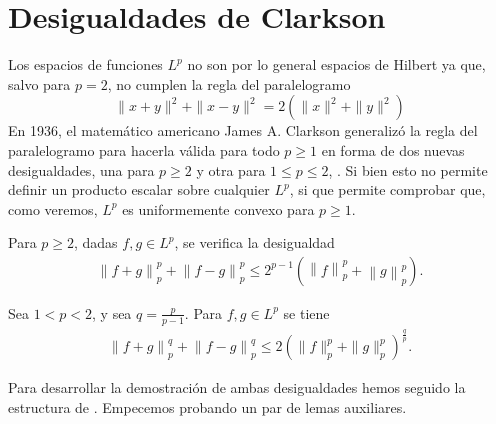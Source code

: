 

\section{Desigualdades de Clarkson}

Los espacios de funciones $ L^p $ no son por lo general espacios de Hilbert ya que, salvo para $ p = 2 $, no cumplen la regla del paralelogramo
$$
    \| x + y \|^2 + \| x - y \|^2 = 2 \left( \| x \|^2 + \| y\|^2 \right)
$$
En 1936, el matemático americano James A. Clarkson generalizó la regla del paralelogramo para hacerla válida para todo $ p \geq 1 $ en forma de dos nuevas desigualdades, una para $p \geq 2 $ y otra para $ 1 \leq p \leq 2 $, \cite{clarkson}. Si bien esto no permite definir un producto escalar sobre cualquier $ L^p $, si que permite comprobar que, como veremos, $ L^p $ es uniformemente convexo para $ p \geq 1 $.

\begin{theorem} \label{thm:clarkson-1}
    Para $ p \geq 2 $, dadas $ f, g \in L^p $, se verifica la desigualdad
    \begin{align} \label{eq:clarkson-1}
        \left\| f+g \right\|_p^p + \left\| f-g \right\|_p^p \leq 2^{p-1} \left( \left\|f\right\|_p^p + \left\|g\right\|_p^p \right).
    \end{align}
\end{theorem}

\begin{theorem}
    Sea $ 1 < p < 2 $, y sea $ q = \frac{p}{p-1}$. Para $ f, g \in L^p $ se tiene
    \begin{align} \label{eq:clarkson-2}
        \left\| f + g \right\|_p^q + \left\| f - g \right\|_p^q \leq 2 \left(\|f \|_p^p + \|g\|_p^p \right)^{\frac{q}{p}}.
    \end{align}
\end{theorem}

Para desarrollar la demostración de ambas desigualdades hemos seguido la estructura de \cite{hewitt}. Empecemos probando un par de lemas auxiliares.

